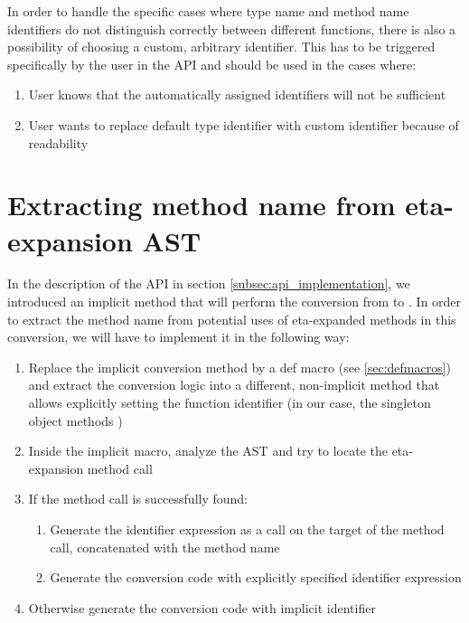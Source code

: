 In order to handle the specific cases where type name and method name identifiers do not distinguish correctly between different functions, there is also a possibility of choosing a custom, arbitrary identifier. This has to be triggered specifically by the user in the API and should be used in the cases where:

\begin{enumerate}
	\item User knows that the automatically assigned identifiers will not be sufficient
	\item User wants to replace default type identifier with custom identifier because of readability
\end{enumerate}

\section{Extracting method name from eta-expansion AST}
\label{sec:extracting_method_name}


In the description of the API in section \ref{subsec:api_implementation}, we introduced an implicit method that will perform the conversion from  to . In order to extract the method name from potential uses of eta-expanded methods in this conversion, we will have to implement it in the following way:

\begin{enumerate}
	\item Replace the implicit conversion method by a def macro (see \ref{sec:defmacros}) and extract the conversion logic into a different, non-implicit method that allows explicitly setting the function identifier (in our case, the  singleton object methods )
	\item Inside the implicit macro, analyze the AST and try to locate the eta-expansion method call
	\item If the method call is successfully found:
	\begin{enumerate}
		\item Generate the identifier expression as a  call on the target of the method call, concatenated with the method name
		\item Generate the conversion code with explicitly specified identifier expression
	\end{enumerate}
	\item Otherwise generate the conversion code with implicit identifier	
\end{enumerate}

